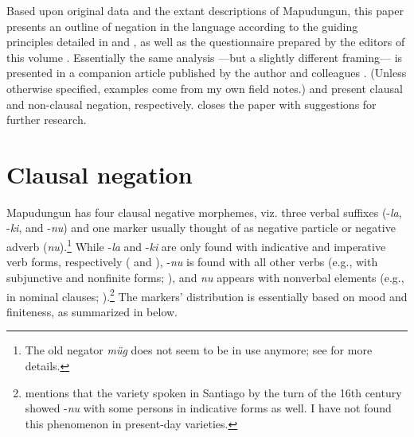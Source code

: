 \documentclass[output=paper,colorlinks,citecolor=brown,draft]{langscibook}
\begin{document}
Based upon original data and the extant descriptions of Mapudungun, this paper presents an outline of negation in the language according to the guiding principles detailed in \citet{Veselinova2014} and \citet{Miestamo2017}, as well as the questionnaire prepared by the editors of this volume  . Essentially the same analysis —but a slightly different framing— is presented in a companion article published by the author and colleagues \citep{OlateEtAl2020}. (Unless otherwise specified, examples come from my own field notes.)  and  present clausal and non-clausal negation, respectively.  closes the paper with suggestions for further research.

\section{Clausal negation}
\label{sec:mapu:2}

Mapudungun has four clausal negative morphemes, viz. three verbal suffixes (-\textit{la}, \nobreakdash-\textit{ki}, and -\textit{nu}) and one marker usually thought of as negative particle or negative adverb (\textit{nu}).\footnote{The old negator \textit{müg} does not seem to be in use anymore; see  for more details.} While -\textit{la} and \nobreakdash-\textit{ki} are only found with indicative and imperative verb forms, respectively ( and ), \nobreakdash-\textit{nu} is found with all other verbs (e.g., with subjunctive and nonfinite forms; ), and \textit{nu} appears with nonverbal elements (e.g., in nominal clauses; ).\footnote{\citet[23]{Valdivia1606} mentions that the variety spoken in Santiago by the turn of the 16th century showed \nobreakdash-\textit{nu} with some persons in indicative forms as well. I have not found this phenomenon in present-day varieties.} The markers’ distribution is essentially based on mood and finiteness, as summarized in  below.

\end{document}
